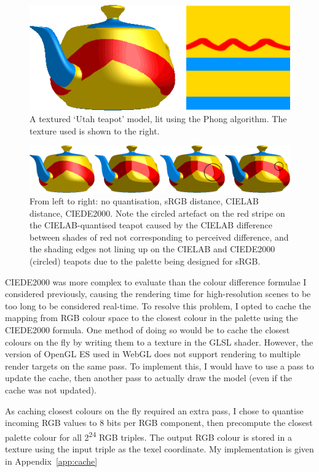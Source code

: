 \documentclass[12pt,twoside,notitlepage]{report}
\begin{document}
\begin{figure}[h!]
\centering
\includegraphics[width=\textwidth]{phongteapot}
\caption{A textured `Utah teapot' model, lit using the Phong algorithm. The texture used is shown to the right.}
\end{figure}

\begin{figure}[h!]
\centering
\includegraphics[width=\textwidth]{teapots}
\caption{From left to right: no quantisation, sRGB distance, CIELAB distance, CIEDE2000. Note the circled artefact on the red stripe on the CIELAB-quantised teapot caused by the CIELAB difference between shades of red not corresponding to perceived difference, and the shading edges not lining up on the CIELAB and CIEDE2000 (circled) teapots due to the palette being designed for sRGB.}
\label{fig:teapots}
\end{figure}

CIEDE2000 was more complex to evaluate than the colour difference formulae I considered previously, causing the rendering time for high-resolution scenes to be too long to be considered real-time. To resolve this problem, I opted to cache the mapping from RGB colour space to the closest colour in the palette using the CIEDE2000 formula. One method of doing so would be to cache the closest colours on the fly by writing them to a texture in the GLSL shader. However, the version of OpenGL ES used in WebGL does not support rendering to multiple render targets on the same pass. To implement this, I would have to use a pass to update the cache, then another pass to actually draw the model (even if the cache was not updated).

As caching closest colours on the fly required an extra pass, I chose to quantise incoming RGB values to 8 bits per RGB component, then precompute the closest palette colour for all 2\textsuperscript{24} RGB triples. The output RGB colour is stored in a texture using the input triple as the texel coordinate. My implementation is given in Appendix~\ref{app:cache}
\end{document}
